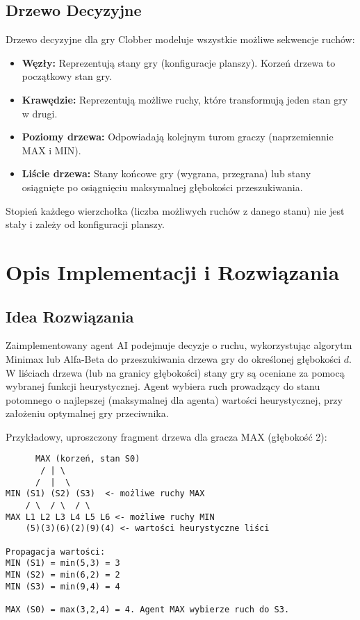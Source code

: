\documentclass[11pt,a4paper]{article}
\begin{document}
\subsection{Drzewo Decyzyjne}
Drzewo decyzyjne dla gry Clobber modeluje wszystkie możliwe sekwencje ruchów:
\begin{itemize}
    \item \textbf{Węzły:} Reprezentują stany gry (konfiguracje planszy). Korzeń drzewa to początkowy stan gry.
    \item \textbf{Krawędzie:} Reprezentują możliwe ruchy, które transformują jeden stan gry w drugi.
    \item \textbf{Poziomy drzewa:} Odpowiadają kolejnym turom graczy (naprzemiennie MAX i MIN).
    \item \textbf{Liście drzewa:} Stany końcowe gry (wygrana, przegrana) lub stany osiągnięte po osiągnięciu maksymalnej głębokości przeszukiwania.
\end{itemize}
Stopień każdego wierzchołka (liczba możliwych ruchów z danego stanu) nie jest stały i zależy od konfiguracji planszy.

\section{Opis Implementacji i Rozwiązania}
\subsection{Idea Rozwiązania}
Zaimplementowany agent AI podejmuje decyzje o ruchu, wykorzystując algorytm Minimax lub Alfa-Beta do przeszukiwania drzewa gry do określonej głębokości $d$. W liściach drzewa (lub na granicy głębokości) stany gry są oceniane za pomocą wybranej funkcji heurystycznej. Agent wybiera ruch prowadzący do stanu potomnego o najlepszej (maksymalnej dla agenta) wartości heurystycznej, przy założeniu optymalnej gry przeciwnika.

Przykładowy, uproszczony fragment drzewa dla gracza MAX (głębokość 2):
\begin{verbatim}
      MAX (korzeń, stan S0)
       / | \
      /  |  \
MIN (S1) (S2) (S3)  <- możliwe ruchy MAX
    / \  / \  / \
MAX L1 L2 L3 L4 L5 L6 <- możliwe ruchy MIN
    (5)(3)(6)(2)(9)(4) <- wartości heurystyczne liści

Propagacja wartości:
MIN (S1) = min(5,3) = 3
MIN (S2) = min(6,2) = 2
MIN (S3) = min(9,4) = 4

MAX (S0) = max(3,2,4) = 4. Agent MAX wybierze ruch do S3.
\end{verbatim}
\end{document}
